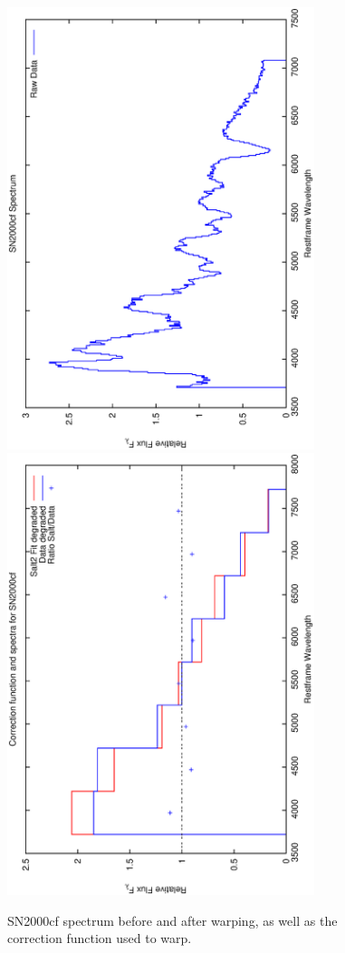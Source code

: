 \clearpage

\begin{figure}[p]
\centering
\includegraphics[angle=-90,width=0.8\textwidth]{./figures/spectrabeforeafter/SN2000cf_handpicked_v001_v027_before_after_spectra.ps}
\hfill
\includegraphics[angle=-90,width=0.8\textwidth]{./figures/corrections/SN2000cf_v001_correction.ps}
\hfill
\caption{SN2000cf spectrum before and after warping, as well as the correction function used to warp.}
\label{fig:SN2000cffour1}
\end{figure}

